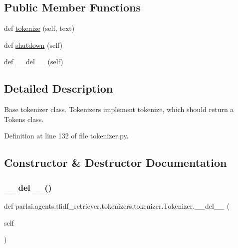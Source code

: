 \subsection*{Public Member Functions}
\begin{DoxyCompactItemize}
\item 
def \hyperlink{classparlai_1_1agents_1_1tfidf__retriever_1_1tokenizers_1_1tokenizer_1_1Tokenizer_a548699f403463496523213f3cf80c6c6}{tokenize} (self, text)
\item 
def \hyperlink{classparlai_1_1agents_1_1tfidf__retriever_1_1tokenizers_1_1tokenizer_1_1Tokenizer_a9c4af22e2a89737e6464bf031d16e32c}{shutdown} (self)
\item 
def \hyperlink{classparlai_1_1agents_1_1tfidf__retriever_1_1tokenizers_1_1tokenizer_1_1Tokenizer_aa2153a444d794bde7283f8bad237a8e6}{\+\_\+\+\_\+del\+\_\+\+\_\+} (self)
\end{DoxyCompactItemize}


\subsection{Detailed Description}
\begin{DoxyVerb}Base tokenizer class.
Tokenizers implement tokenize, which should return a Tokens class.
\end{DoxyVerb}
 

Definition at line 132 of file tokenizer.\+py.



\subsection{Constructor \& Destructor Documentation}
\mbox{\label{classparlai_1_1agents_1_1tfidf__retriever_1_1tokenizers_1_1tokenizer_1_1Tokenizer_aa2153a444d794bde7283f8bad237a8e6}} 
\subsubsection{\texorpdfstring{\+\_\+\+\_\+del\+\_\+\+\_\+()}{\_\_del\_\_()}}
{\footnotesize\ttfamily def parlai.\+agents.\+tfidf\+\_\+retriever.\+tokenizers.\+tokenizer.\+Tokenizer.\+\_\+\+\_\+del\+\_\+\+\_\+ (\begin{DoxyParamCaption}\item[{}]{self }\end{DoxyParamCaption})}




